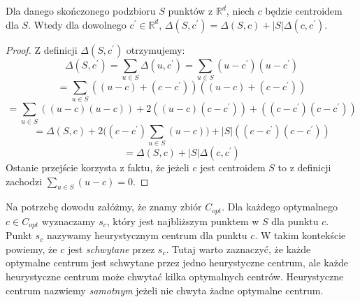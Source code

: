 \begin{lemma}{\cite{10.1145/1007352.1007400}}
    Dla danego skończonego podzbioru $S$ punktów z $\mathbb{R}^d$, niech $c$ będzie centroidem dla $S$. Wtedy dla dowolnego $c^{'} \in \mathbb{R}^d$, $\Delta(S, c^{'}) = \Delta(S, c) + |S|\Delta(c, c^{'})$.
\end{lemma}
\begin{proof}
    Z definicji $\Delta(S, c^{'})$ otrzymujemy:
    \begin{equation}
        \Delta(S, c^{'}) = \sum_{u \in S} \Delta(u, c^{'}) =  \sum_{u \in S} (u - c^{'}) (u - c^{'})
    \end{equation}
    \begin{equation}
         = \sum_{u \in S} ((u - c) + (c - c^{'})) ((u - c) + (c - c^{'}))
    \end{equation}
    \begin{equation}
        = \sum_{u \in S} ((u - c)(u - c)) + 2((u - c)(c - c^{'})) + ((c - c^{'})(c - c^{'}))
    \end{equation}
    \begin{equation}
        = \Delta(S, c) + 2\Big( (c - c^{'}) \sum_{u \in S} (u - c) \Big) + |S|((c - c^{'})(c - c^{'}))
    \end{equation}
    \begin{equation}
        = \Delta(S, c) + |S|\Delta(c,c^{'})
    \end{equation}
    Ostanie przejście korzysta z faktu, że jeżeli $c$ jest centroidem $S$ to z definicji zachodzi $\sum_{u \in S} (u - c) = 0$.
\end{proof}

\noindent
Na potrzebę dowodu załóżmy, że znamy zbiór $C_{opt}$.
Dla każdego optymalnego $c \in C_{opt}$ wyznaczamy $s_{c}$, który jest najbliższym punktem w $S$ dla punktu $c$.
Punkt $s_{c}$ nazywamy heurystycznym centrum dla punktu $c$.
W takim kontekście powiemy, że $c$ jest \textit{schwytane} przez $s_{c}$.
Tutaj warto zaznaczyć, że każde optymalne centrum jest schwytane przez jedno heurystyczne centrum, ale każde heurystyczne centrum może chwytać kilka optymalnych centrów.
Heurystyczne centrum nazwiemy \textit{samotnym} jeżeli nie chwyta żadne optymalne centrum.

